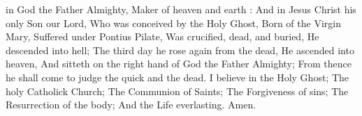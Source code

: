  in God the Father Almighty, Maker of heaven and earth :
And in Jesus Christ his only Son our Lord, Who was conceived by the Holy Ghost, Born of the Virgin Mary, Suffered under Pontius Pilate, Was crucified, dead, and buried, He descended into hell;
The third day he rose again from the dead, He ascended into heaven, And sitteth on the right hand of God the Father Almighty; From thence he shall come to judge the quick and the dead.
I believe in the Holy Ghost; The holy Catholick Church; The Communion of Saints; The Forgiveness of sins; The Resurrection of the body; And the Life everlasting. Amen.
